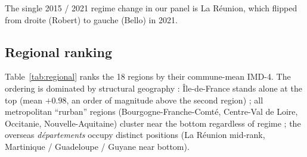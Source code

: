 \documentclass[11pt,a4paper]{article}
\begin{document}
The single 2015 / 2021 regime change in our panel is La R\'eunion,
which flipped from droite (Robert) to gauche (Bello) in 2021.

\subsection{Regional ranking}

Table~\ref{tab:regional} ranks the 18 regions by their commune-mean
IMD-4.  The ordering is dominated by structural geography :
\^Ile-de-France stands alone at the top (mean $+0.98$, an order of
magnitude above the second region) ; all metropolitan
``rurban'' regions (Bourgogne-Franche-Comt\'e, Centre-Val de Loire,
Occitanie, Nouvelle-Aquitaine) cluster near the bottom regardless of
regime ; the overseas \emph{d\'epartements} occupy distinct positions
(La R\'eunion mid-rank, Martinique / Guadeloupe / Guyane near bottom).
\end{document}
